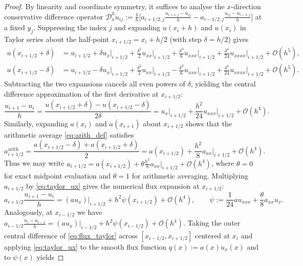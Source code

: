 \documentclass[11pt,a4paper]{article}
\theoremstyle{definition}
\theoremstyle{remark}
\begin{document}
\begin{proof}
	By linearity and coordinate symmetry, it suffices to analyse the $x$-direction conservative difference operator $\mathcal{D}_x^h u_{ij} := \frac{1}{h}\bigl[ a_{i+1/2,j}\frac{u_{i+1,j}-u_{ij}}{h} - a_{i-1/2,j}\frac{u_{ij}-u_{i-1,j}}{h} \bigr]$ at a fixed $y_j$. Suppressing the index $j$ and expanding $u(x_i+h)$ and $u(x_i)$ in Taylor series about the half-point $x_{i+1/2} = x_i + h/2$ (with step $\delta = h/2$) gives
	\begin{align}
		u(x_{i+1/2} + \delta) &= u_{i+1/2} + \delta u_x\big|_{i+1/2} + \frac{\delta^2}{2}u_{xx}\big|_{i+1/2} + \frac{\delta^3}{6}u_{xxx}\big|_{i+1/2} + \frac{\delta^4}{24}u_{xxxx}\big|_{i+1/2} + \mathcal{O}(h^5), \\
		u(x_{i+1/2} - \delta) &= u_{i+1/2} - \delta u_x\big|_{i+1/2} + \frac{\delta^2}{2}u_{xx}\big|_{i+1/2} - \frac{\delta^3}{6}u_{xxx}\big|_{i+1/2} + \frac{\delta^4}{24}u_{xxxx}\big|_{i+1/2} + \mathcal{O}(h^5).
	\end{align}
	Subtracting the two expansions cancels all even powers of $\delta$, yielding the central difference approximation of the first derivative at $x_{i+1/2}$:
	\begin{equation}
		\frac{u_{i+1} - u_i}{h} = \frac{u(x_{i+1/2}+\delta) - u(x_{i+1/2}-\delta)}{2\delta} = u_x\big|_{i+1/2} + \frac{h^2}{24}u_{xxx}\big|_{i+1/2} + \mathcal{O}(h^4).
		\label{eq:taylor_ux}
	\end{equation}
	Similarly, expanding $a(x_i)$ and $a(x_{i+1})$ about $x_{i+1/2}$ shows that the arithmetic average \eqref{eq:arith_def} satisfies
	\begin{equation}
		a_{i+1/2}^{\text{arith}} = \frac{a(x_{i+1/2}-\delta) + a(x_{i+1/2}+\delta)}{2} = a(x_{i+1/2}) + \frac{h^2}{8}a_{xx}\big|_{i+1/2} + \mathcal{O}(h^4).
		\label{eq:taylor_a_arith}
	\end{equation}
	Thus we may write $a_{i+1/2} = a(x_{i+1/2}) + \theta \frac{h^2}{8}a_{xx}|_{i+1/2} + \mathcal{O}(h^4)$, where $\theta = 0$ for exact midpoint evaluation and $\theta = 1$ for arithmetic averaging. Multiplying $a_{i+1/2}$ by \eqref{eq:taylor_ux} gives the numerical flux expansion at $x_{i+1/2}$:
	\begin{equation}
		a_{i+1/2}\frac{u_{i+1}-u_i}{h} = (au_x)\big|_{i+1/2} + h^2 \psi(x_{i+1/2}) + \mathcal{O}(h^4), \qquad \psi := \frac{1}{24}a u_{xxx} + \frac{\theta}{8}a_{xx}u_x.
		\label{eq:flux_taylor}
	\end{equation}
	Analogously, at $x_{i-1/2}$ we have $a_{i-1/2}\frac{u_i-u_{i-1}}{h} = (au_x)|_{i-1/2} + h^2 \psi(x_{i-1/2}) + \mathcal{O}(h^4)$. Taking the outer central difference of \eqref{eq:flux_taylor} across $[x_{i-1/2}, x_{i+1/2}]$ centered at $x_i$ and applying \eqref{eq:taylor_ux} to the smooth flux function $q(x) := a(x)u_x(x)$ and to $\psi(x)$ yields

\end{proof}
\end{document}
